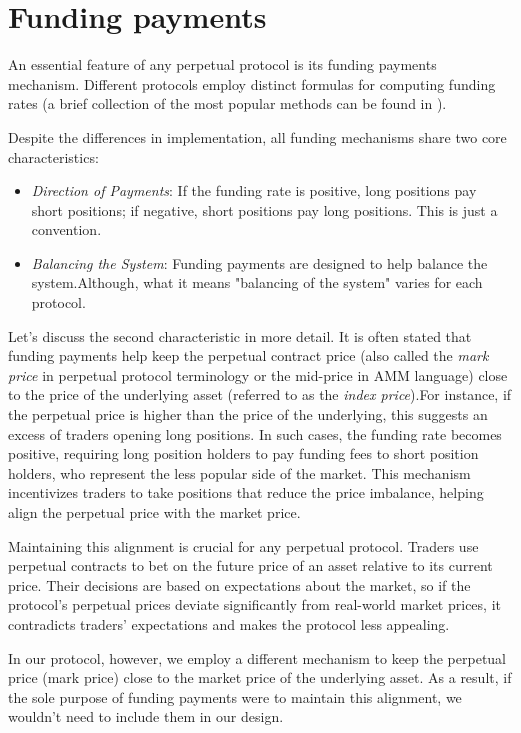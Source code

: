 \documentclass{article}
\begin{document}
\section{Funding payments}\label{funding}

An essential feature of any perpetual protocol is its funding payments mechanism. Different protocols employ distinct formulas for computing funding rates (a brief collection of the most popular methods can be found in \cite{review}).

Despite the differences in implementation, all funding mechanisms share two core characteristics:

\begin{itemize}
\item \textit{Direction of Payments}: If the funding rate is positive, long positions pay short positions; if negative, short positions pay long positions. This is just a convention.
\item \textit{Balancing the System}: Funding payments are designed to help balance the system.Although, what it means "balancing of the system" varies for each protocol.
\end{itemize}

Let’s discuss the second characteristic in more detail. It is often stated that funding payments help keep the perpetual contract price (also called the \textit{mark price} in perpetual protocol terminology or the mid-price in AMM language) close to the price of the underlying asset (referred to as the \textit{index price}).For instance, if the perpetual price is higher than the price of the underlying, this suggests an excess of traders opening long positions. In such cases, the funding rate becomes positive, requiring long position holders to pay funding fees to short position holders, who represent the less popular side of the market. This mechanism incentivizes traders to take positions that reduce the price imbalance, helping align the perpetual price with the market price.

Maintaining this alignment is crucial for any perpetual protocol. Traders use perpetual contracts to bet on the future price of an asset relative to its current price. Their decisions are based on expectations about the market, so if the protocol’s perpetual prices deviate significantly from real-world market prices, it contradicts traders' expectations and makes the protocol less appealing.

In our protocol, however, we employ a different mechanism to keep the perpetual price (mark price) close to the market price of the underlying asset. As a result, if the sole purpose of funding payments were to maintain this alignment, we wouldn’t need to include them in our design.
\end{document}
